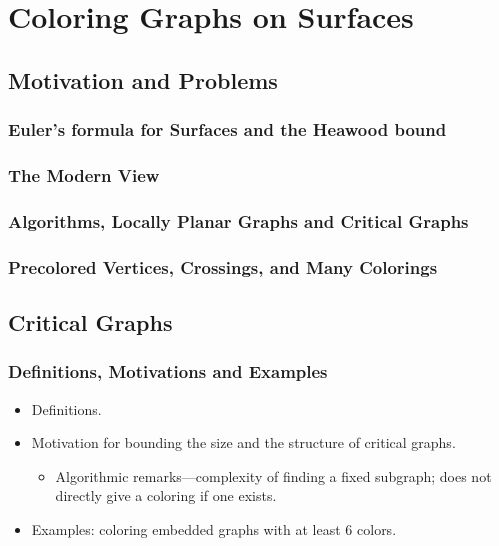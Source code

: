 \documentclass[12pt,twoside,openright,a4paper]{book}
\begin{document}
\part{Coloring Graphs on Surfaces}

\chapter{Motivation and Problems}


\section{Euler's formula for Surfaces and the Heawood bound}\label{sec:heawood}

\section{The Modern View}

\section{Algorithms, Locally Planar Graphs and Critical Graphs}

\section{Precolored Vertices, Crossings, and Many Colorings}

\chapter{Critical Graphs}


\section{Definitions, Motivations and Examples}

\begin{itemize}
\item Definitions.
\item Motivation for bounding the size and the structure of critical graphs.
\begin{itemize}
\item Algorithmic remarks---complexity of finding a fixed subgraph; does not directly
give a coloring if one exists.
\end{itemize}
\item Examples: coloring embedded graphs with at least $6$ colors.
\end{itemize}
\end{document}
